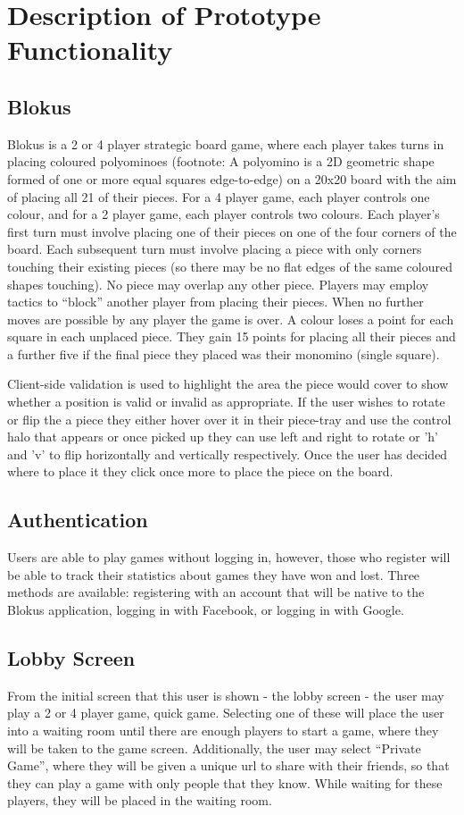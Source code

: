 \section{Description of Prototype Functionality}

\subsection{Blokus}
Blokus is a 2 or 4 player strategic board game, where each player takes turns in placing coloured polyominoes (footnote: A polyomino is a 2D geometric shape formed of one or more equal squares edge-to-edge) on a 20x20 board with the aim of placing all 21 of their pieces. For a 4 player game, each player controls one colour, and for a 2 player game, each player controls two colours. Each player’s first turn must involve placing one of their pieces on one of the four corners of the board. Each subsequent turn must involve placing a piece with only corners touching their existing pieces (so there may be no flat edges of the same coloured shapes touching).  No piece may overlap any other piece. Players may employ tactics to “block” another player from placing their pieces. When no further moves are possible by any player the game is over. A colour loses a point for each square in each unplaced piece. They gain 15 points for placing all their pieces and a further five if the final piece they placed was their monomino (single square).

Client-side validation is used to highlight the area the piece would cover to show whether a position is valid or invalid as appropriate. If the user wishes to rotate or flip the a piece they either hover over it in their piece-tray and use the control halo that appears or once picked up they can use left and right to rotate or ’h’ and ’v’ to flip horizontally and vertically respectively. Once the user has decided where to place it they click once more to place the piece on the board.

\subsection{Authentication}
Users are able to play games without logging in, however, those who register will be able to track their statistics about games they have won and lost. Three methods are available: registering with an account that will be native to the Blokus application, logging in with Facebook, or logging in with Google.

\subsection{Lobby Screen}
From the initial screen that this user is shown - the lobby screen - the user may play a 2 or 4 player game, quick game. Selecting one of these will place the user into a waiting room until there are enough players to start a game, where they will be taken to the game screen. Additionally, the user may select “Private Game”, where they will be given a unique url to share with their friends, so that they can play a game with only people that they know. While waiting for these players, they will be placed in the waiting room.
